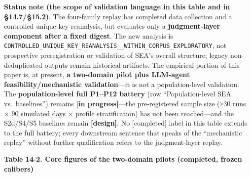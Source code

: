 \documentclass[
  11pt]{article}
\begin{document}
\textbf{Status note (the scope of validation language in this table and
in §14.7/§15.2)}. The four-family replay has completed data collection
and a controlled unique-key reanalysis, but evaluates only a
\textbf{judgment-layer component after a fixed digest}. The new analysis
is
\texttt{CONTROLLED\_UNIQUE\_KEY\_REANALYSIS\_\_WITHIN\_CORPUS\_EXPLORATORY},
not prospective preregistration or validation of SEA's overall
structure; legacy non-deduplicated outputs remain historical artifacts.
The empirical portion of this paper is, at present, \textbf{a two-domain
pilot plus LLM-agent feasibility/mechanistic validation}---it is not a
population-level validation. The \textbf{population-level full P1--P12
battery} (row ``Population-level SEA vs.~baselines'') remains
\textbf{{[}in progress{]}}---the pre-registered sample size (≥30 runs ×
90 simulated days × profile stratification) has not been reached---and
the S2d/S4/S5 baselines remain \textbf{{[}design{]}}. No {[}completed{]}
label in this table extends to the full battery; every downstream
sentence that speaks of the ``mechanistic replay'' without further
qualification refers to the judgment-layer replay.

\textbf{Table 14-2. Core figures of the two-domain pilots (completed,
frozen calibers)}
\end{document}
